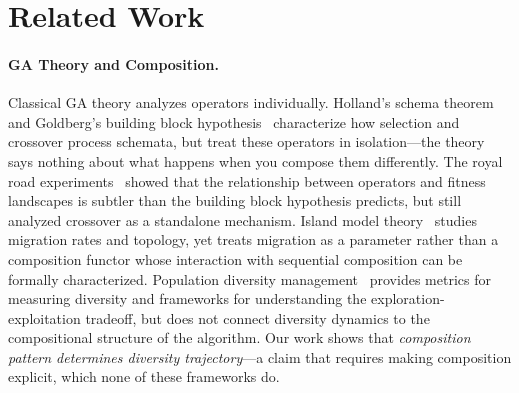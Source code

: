 \documentclass[sigconf,anonymous]{acmart}
\begin{document}
\section{Related Work}

\paragraph{GA Theory and Composition.}
Classical GA theory analyzes operators individually. Holland's schema theorem~\cite{holland1975adaptation} and Goldberg's building block hypothesis~\cite{goldberg1989genetic, goldberg2002design} characterize how selection and crossover process schemata, but treat these operators in isolation---the theory says nothing about what happens when you compose them differently. The royal road experiments~\cite{mitchell1992royal} showed that the relationship between operators and fitness landscapes is subtler than the building block hypothesis predicts, but still analyzed crossover as a standalone mechanism. Island model theory~\cite{whitley1999island, skolicki2005influence} studies migration rates and topology, yet treats migration as a parameter rather than a composition functor whose interaction with sequential composition can be formally characterized. Population diversity management~\cite{burke2004diversity, crepinsek2013exploration} provides metrics for measuring diversity and frameworks for understanding the exploration-exploitation tradeoff, but does not connect diversity dynamics to the compositional structure of the algorithm. Our work shows that \emph{composition pattern determines diversity trajectory}---a claim that requires making composition explicit, which none of these frameworks do.
\end{document}
